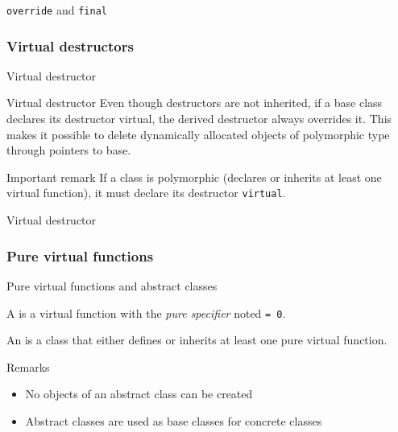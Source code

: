 \begin{frame}{\texttt{override} and \texttt{final}}{}
  \begin{example}
  \end{example}
\end{frame}

\subsubsection{Virtual destructors}

\begin{frame}{Virtual destructor}{}
  \begin{block}{Virtual destructor}
    Even though destructors are not inherited, if a base class declares its destructor virtual, the derived destructor always overrides it. This makes it possible to delete dynamically allocated objects of polymorphic type through pointers to base.
  \end{block}
  \begin{block}{Important remark}
    If a class is polymorphic (declares or inherits at least one virtual function), it must declare its destructor \lstinline!virtual!.
  \end{block}
\end{frame}

\begin{frame}{Virtual destructor}{}
  \begin{example}
  \end{example}
\end{frame}

\subsubsection{Pure virtual functions}

\begin{frame}{Pure virtual functions and abstract classes}{}
  \begin{definition}
    A  is a virtual function with the \emph{pure specifier} noted \lstinline!= 0!.
  \end{definition}

  \begin{definition}
    An  is a class that either defines or inherits at least one pure virtual function.
  \end{definition}

  \begin{block}{Remarks}
    \begin{itemize}
    \item
      No objects of an abstract class can be created
    \item
      Abstract classes are used as base classes for concrete classes
    \end{itemize}
  \end{block}
\end{frame}

